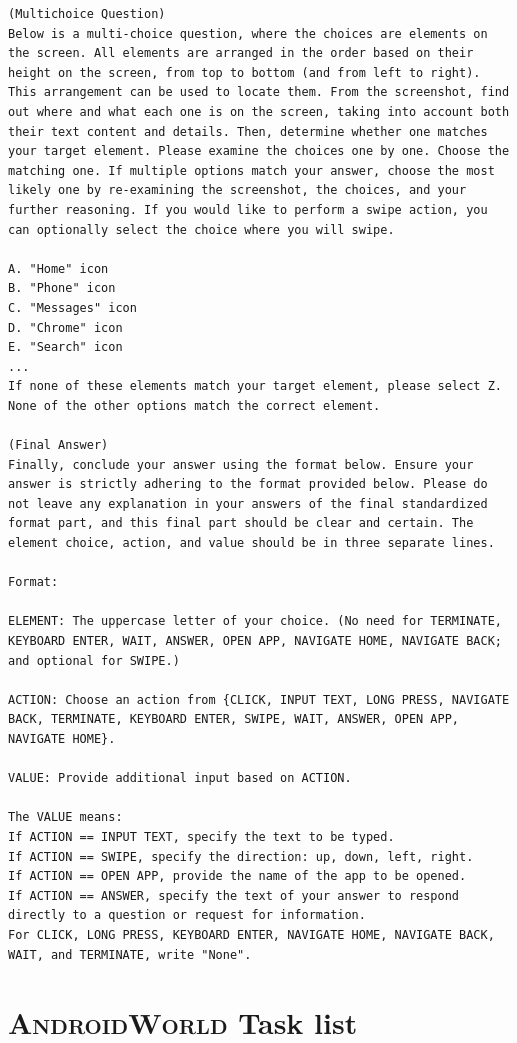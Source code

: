 \documentclass{article}
\newcommand{\system}{\textsc{AndroidWorld}\xspace}
\begin{document}
\begin{appendices}
\begin{lstlisting}[basicstyle=\ttfamily\footnotesize,breaklines=true,language={}, style=mystyle, keywordstyle=\color{black}]
(Multichoice Question)
Below is a multi-choice question, where the choices are elements on the screen. All elements are arranged in the order based on their height on the screen, from top to bottom (and from left to right). This arrangement can be used to locate them. From the screenshot, find out where and what each one is on the screen, taking into account both their text content and details. Then, determine whether one matches your target element. Please examine the choices one by one. Choose the matching one. If multiple options match your answer, choose the most likely one by re-examining the screenshot, the choices, and your further reasoning. If you would like to perform a swipe action, you can optionally select the choice where you will swipe.

A. "Home" icon
B. "Phone" icon
C. "Messages" icon
D. "Chrome" icon
E. "Search" icon
...
If none of these elements match your target element, please select Z. None of the other options match the correct element.

(Final Answer)
Finally, conclude your answer using the format below. Ensure your answer is strictly adhering to the format provided below. Please do not leave any explanation in your answers of the final standardized format part, and this final part should be clear and certain. The element choice, action, and value should be in three separate lines.

Format:

ELEMENT: The uppercase letter of your choice. (No need for TERMINATE, KEYBOARD ENTER, WAIT, ANSWER, OPEN APP, NAVIGATE HOME, NAVIGATE BACK; and optional for SWIPE.)

ACTION: Choose an action from {CLICK, INPUT TEXT, LONG PRESS, NAVIGATE BACK, TERMINATE, KEYBOARD ENTER, SWIPE, WAIT, ANSWER, OPEN APP, NAVIGATE HOME}.

VALUE: Provide additional input based on ACTION.

The VALUE means:
If ACTION == INPUT TEXT, specify the text to be typed.
If ACTION == SWIPE, specify the direction: up, down, left, right.
If ACTION == OPEN APP, provide the name of the app to be opened.
If ACTION == ANSWER, specify the text of your answer to respond directly to a question or request for information.
For CLICK, LONG PRESS, KEYBOARD ENTER, NAVIGATE HOME, NAVIGATE BACK, WAIT, and TERMINATE, write "None".
\end{lstlisting}

\section{\system Task list}
\label{sec:task_list}


\end{appendices}
\end{document}
